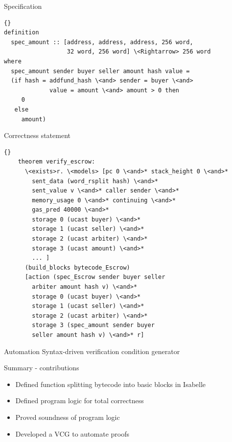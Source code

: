 \documentclass{beamer}
\begin{document}
	\begin{frame}[fragile]{Specification}
		\begin{lstlisting}[language=Isar,keywords={[3]{addfund\_hash,pay\_hash,refund\_hash,}}]{} 
definition
  spec_amount :: [address, address, address, 256 word, 
                  32 word, 256 word] \<Rightarrow> 256 word
where
  spec_amount sender buyer seller amount hash value =
  (if hash = addfund_hash \<and> sender = buyer \<and>
             value = amount \<and> amount > 0 then
     0
   else
     amount)
\end{lstlisting}	
\end{frame}

\begin{frame}[fragile]{Correctness statement}
	\begin{lstlisting}[language=Isar,keywords={[3]{hash,sender,buyer,seller,arbiter,amount,v}}]{}
	theorem verify_escrow:
	  \<exists>r. \<models> [pc 0 \<and>* stack_height 0 \<and>*
	    sent_data (word_rsplit hash) \<and>*
	    sent_value v \<and>* caller sender \<and>*
	    memory_usage 0 \<and>* continuing \<and>*
	    gas_pred 40000 \<and>*
	    storage 0 (ucast buyer) \<and>*
	    storage 1 (ucast seller) \<and>*
	    storage 2 (ucast arbiter) \<and>*
	    storage 3 (ucast amount) \<and>*
	    ... ]
	  (build_blocks bytecode_Escrow)
	  [action (spec_Escrow sender buyer seller
	    arbiter amount hash v) \<and>*
	    storage 0 (ucast buyer) \<and>*
	    storage 1 (ucast seller) \<and>*
	    storage 2 (ucast arbiter) \<and>*
	    storage 3 (spec_amount sender buyer
	    seller amount hash v) \<and>* r]
	\end{lstlisting}
\end{frame}

\begin{frame}{Automation}
	\centering
  Syntax-driven verification
  condition generator
\end{frame}

\begin{frame}{Summary - contributions}
	\begin{itemize}
		\item Defined function splitting bytecode into basic blocks in Isabelle
		\item Defined program logic for total correctness
		\item Proved soundness of program logic
		\item Developed a VCG to automate proofs
	\end{itemize}

\end{frame}
\end{document}
